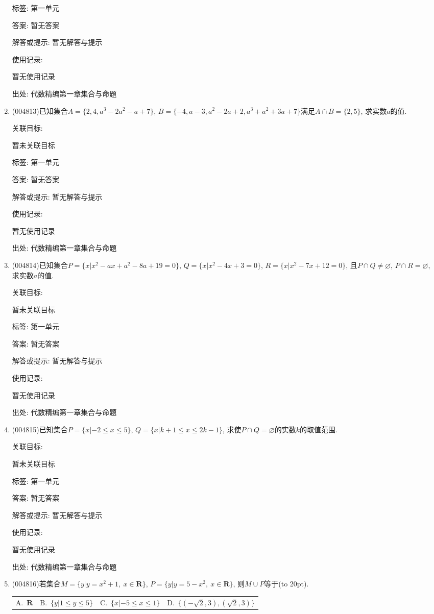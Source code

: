 \documentclass[10pt,a4paper]{article}
\newcommand{\bracket}[1]{(\hbox to #1pt{})}
\newcommand{\fourch}[4]{\par\begin{tabular}{p{.23\textwidth}p{.23\textwidth}p{.23\textwidth}p{.23\textwidth}}
A.~#1 &B.~#2& C.~#3& D.~#4
\end{tabular}}
\begin{document}
\begin{enumerate}[1.]
标签: 第一单元

答案: 暂无答案

解答或提示: 暂无解答与提示

使用记录:

暂无使用记录


出处: 代数精编第一章集合与命题
\item { (004813)}已知集合$A=\{2,4,a^3-2a^2-a+7\}$, $B=\{-4,a-3,a^2-2a+2,a^3+a^2+3a+7\}$满足$A\cap B=\{2,5\}$, 求实数$a$的值.


关联目标:

暂未关联目标



标签: 第一单元

答案: 暂无答案

解答或提示: 暂无解答与提示

使用记录:

暂无使用记录


出处: 代数精编第一章集合与命题
\item { (004814)}已知集合$P=\{x|x^2-ax+a^2-8a+19=0\}$, $Q=\{x|x^2-4x+3=0\}$, $R=\{x|x^2-7x+12=0\}$, 且$P\cap Q\ne \varnothing$, $P\cap R=\varnothing$, 求实数$a$的值.


关联目标:

暂未关联目标



标签: 第一单元

答案: 暂无答案

解答或提示: 暂无解答与提示

使用记录:

暂无使用记录


出处: 代数精编第一章集合与命题
\item { (004815)}已知集合$P=\{x|-2\le x\le 5\}$, $Q=\{x|k+1\le x\le 2k-1\}$, 求使$P\cap Q=\varnothing$的实数$k$的取值范围.


关联目标:

暂未关联目标



标签: 第一单元

答案: 暂无答案

解答或提示: 暂无解答与提示

使用记录:

暂无使用记录


出处: 代数精编第一章集合与命题
\item { (004816)}若集合$M=\{y|y=x^2+1, \ x\in \mathbf{R}\}$, $P=\{y|y=5-x^2, \ x\in \mathbf{R}\}$, 则$M\cup P$等于\bracket{20}.
\fourch{$\mathbf{R}$}{$\{y|1\le y\le 5\}$}{$\{x|-5\le x\le 1\}$}{$\{(-\sqrt 2,3),(\sqrt 2,3)\}$}



\end{enumerate}
\end{document}
